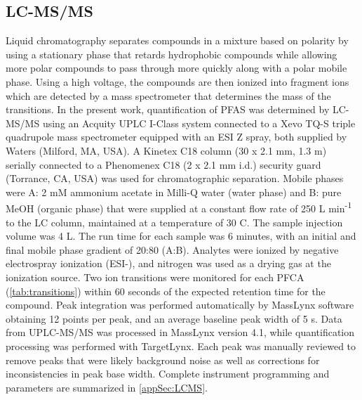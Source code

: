 \subsection{LC-MS/MS}
Liquid chromatography separates compounds in a mixture based on polarity by using a stationary phase that retards hydrophobic compounds while allowing more polar compounds to pass through more quickly along with a polar mobile phase. Using a high voltage, the compounds are then ionized into fragment ions which are detected by a mass spectrometer that determines the mass of the transitions. In the present work, quantification of PFAS was determined by LC-MS/MS using an Acquity UPLC I-Class system connected to a Xevo TQ-S triple quadrupole mass spectrometer equipped with an ESI Z spray, both supplied by Waters (Milford, MA, USA). A Kinetex C18 column (30 x 2.1 mm, 1.3 \textmu m) serially connected to a Phenomenex C18 (2 x 2.1 mm i.d.) security guard (Torrance, CA, USA) was used for chromatographic separation. Mobile phases were A: 2 mM ammonium acetate in Milli-Q water (water phase) and B: pure MeOH (organic phase) that were supplied at a constant flow rate of 250 \textmu L min\textsuperscript{-1} to the LC column, maintained at a temperature of 30 \textdegree C. The sample injection volume was 4 \textmu L. The run time for each sample was 6 minutes, with an initial and final mobile phase gradient of 20:80 (A:B). Analytes were ionized by negative electrospray ionization (ESI-), and nitrogen was used as a drying gas at the ionization source. Two ion transitions were monitored for each PFCA (\cref{tab:transitions}) within 60 seconds of the expected retention time for the compound. Peak integration was performed automatically by MassLynx software obtaining 12 points per peak, and an average baseline peak width of 5 s. Data from UPLC-MS/MS was processed in MassLynx version 4.1, while quantification processing was performed with TargetLynx. Each peak was manually reviewed to remove peaks that were likely background noise as well as corrections for inconsistencies in peak base width. Complete instrument programming and parameters are summarized in \cref{appSec:LCMS}.




